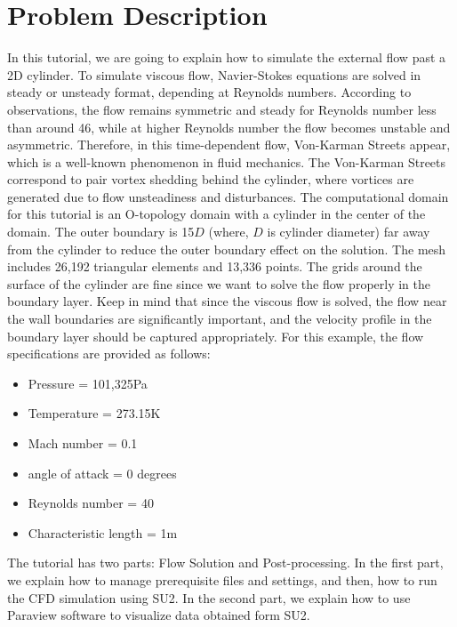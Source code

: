 \section{Problem Description}
In this tutorial, we are going to explain how to simulate the external flow past a 2D cylinder. To simulate viscous flow, Navier-Stokes equations are solved in steady or unsteady format, depending at Reynolds numbers. According to observations, the flow remains symmetric and steady for Reynolds number less than around 46, while at higher Reynolds number the flow becomes unstable and asymmetric. Therefore, in this time-dependent flow,  Von-Karman Streets appear, which is a well-known phenomenon in fluid mechanics. The Von-Karman Streets correspond to pair vortex shedding behind the cylinder, where vortices are generated due to flow unsteadiness and disturbances. The computational domain for this tutorial is an O-topology domain with a cylinder in the center of the domain. The outer boundary is 15$D$ (where, $D$ is cylinder diameter) far away from the cylinder to reduce the outer boundary effect on the solution. The mesh includes 26,192 triangular elements and 13,336 points. The grids around the surface of the cylinder are fine since we want to solve the flow properly in the boundary layer. Keep in mind that since the viscous flow is solved, the flow near the wall boundaries are significantly important, and the velocity profile in the boundary layer should be captured appropriately. For this example, the flow specifications are provided as follows:
\begin{itemize}
    \item Pressure = 101,325Pa
    \item Temperature = 273.15K
    \item Mach number = 0.1
    \item angle of attack = 0 degrees
    \item Reynolds number = 40
    \item Characteristic length = 1m
\end{itemize}
The tutorial has two parts: Flow Solution and Post-processing. In the first part, we explain how to manage prerequisite files and settings, and then, how to run the CFD simulation using SU2. In the second part, we explain how to use Paraview software to visualize data obtained form SU2.
